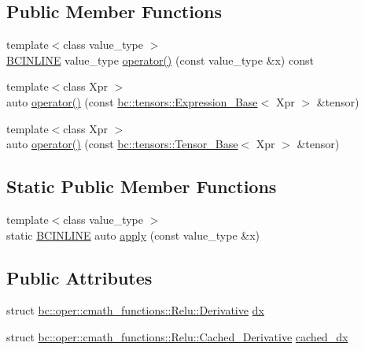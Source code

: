 \subsection*{Public Member Functions}
\begin{DoxyCompactItemize}
\item 
{\footnotesize template$<$class value\+\_\+type $>$ }\\\hyperlink{common_8h_a6699e8b0449da5c0fafb878e59c1d4b1}{B\+C\+I\+N\+L\+I\+NE} value\+\_\+type \hyperlink{structbc_1_1oper_1_1cmath__functions_1_1Relu_a478ddb6722ae034ef9246f69ba9afd6b}{operator()} (const value\+\_\+type \&x) const
\item 
{\footnotesize template$<$class Xpr $>$ }\\auto \hyperlink{structbc_1_1oper_1_1cmath__functions_1_1Relu_a1ee5d3be431e92708d3ca56c437de8a8}{operator()} (const \hyperlink{classbc_1_1tensors_1_1Expression__Base}{bc\+::tensors\+::\+Expression\+\_\+\+Base}$<$ Xpr $>$ \&tensor)
\item 
{\footnotesize template$<$class Xpr $>$ }\\auto \hyperlink{structbc_1_1oper_1_1cmath__functions_1_1Relu_a17e9d7f907010478a6ff8b13d96ff922}{operator()} (const \hyperlink{classbc_1_1tensors_1_1Tensor__Base}{bc\+::tensors\+::\+Tensor\+\_\+\+Base}$<$ Xpr $>$ \&tensor)
\end{DoxyCompactItemize}
\subsection*{Static Public Member Functions}
\begin{DoxyCompactItemize}
\item 
{\footnotesize template$<$class value\+\_\+type $>$ }\\static \hyperlink{common_8h_a6699e8b0449da5c0fafb878e59c1d4b1}{B\+C\+I\+N\+L\+I\+NE} auto \hyperlink{structbc_1_1oper_1_1cmath__functions_1_1Relu_aa44eaf05d55004b9808897ea0498c92b}{apply} (const value\+\_\+type \&x)
\end{DoxyCompactItemize}
\subsection*{Public Attributes}
\begin{DoxyCompactItemize}
\item 
struct \hyperlink{structbc_1_1oper_1_1cmath__functions_1_1Relu_1_1Derivative}{bc\+::oper\+::cmath\+\_\+functions\+::\+Relu\+::\+Derivative} \hyperlink{structbc_1_1oper_1_1cmath__functions_1_1Relu_aa3602950247d253df9eddadf6314bdb4}{dx}
\item 
struct \hyperlink{structbc_1_1oper_1_1cmath__functions_1_1Relu_1_1Cached__Derivative}{bc\+::oper\+::cmath\+\_\+functions\+::\+Relu\+::\+Cached\+\_\+\+Derivative} \hyperlink{structbc_1_1oper_1_1cmath__functions_1_1Relu_aeaabe68960f04be06736b926b695d70c}{cached\+\_\+dx}
\end{DoxyCompactItemize}


